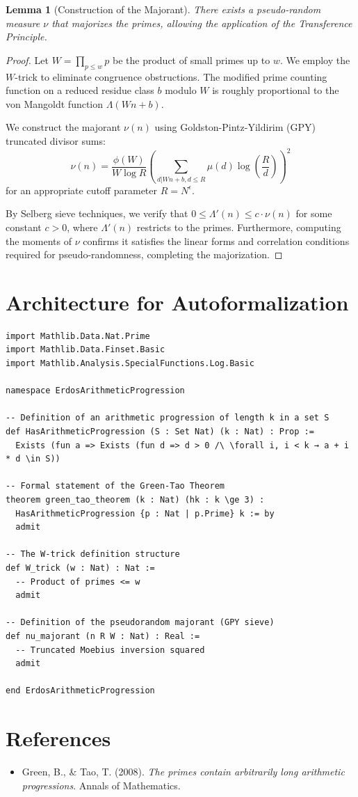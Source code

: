 \documentclass[12pt,a4paper]{article}
\newtheorem{lemma}{Lemma}
\begin{document}
\begin{lemma}[Construction of the Majorant]
There exists a pseudo-random measure $\nu$ that majorizes the primes, allowing the application of the Transference Principle.
\end{lemma}
\begin{proof}
Let $W = \prod_{p \leq w} p$ be the product of small primes up to $w$. We employ the $W$-trick to eliminate congruence obstructions. The modified prime counting function on a reduced residue class $b$ modulo $W$ is roughly proportional to the von Mangoldt function $\Lambda(Wn + b)$.

We construct the majorant $\nu(n)$ using Goldston-Pintz-Yildirim (GPY) truncated divisor sums:
$$ \nu(n) = \frac{\phi(W)}{W \log R} \left( \sum_{d | Wn + b, d \leq R} \mu(d) \log\left(\frac{R}{d}\right) \right)^2 $$
for an appropriate cutoff parameter $R = N^{\epsilon}$.

By Selberg sieve techniques, we verify that $0 \leq \Lambda'(n) \leq c \cdot \nu(n)$ for some constant $c>0$, where $\Lambda'(n)$ restricts to the primes. Furthermore, computing the moments of $\nu$ confirms it satisfies the linear forms and correlation conditions required for pseudo-randomness, completing the majorization.
\end{proof}

\section{Architecture for Autoformalization}

\begin{verbatim}
import Mathlib.Data.Nat.Prime
import Mathlib.Data.Finset.Basic
import Mathlib.Analysis.SpecialFunctions.Log.Basic

namespace ErdosArithmeticProgression

-- Definition of an arithmetic progression of length k in a set S
def HasArithmeticProgression (S : Set Nat) (k : Nat) : Prop :=
  Exists (fun a => Exists (fun d => d > 0 /\ \forall i, i < k → a + i * d \in S))

-- Formal statement of the Green-Tao Theorem
theorem green_tao_theorem (k : Nat) (hk : k \ge 3) :
  HasArithmeticProgression {p : Nat | p.Prime} k := by
  admit

-- The W-trick definition structure
def W_trick (w : Nat) : Nat :=
  -- Product of primes <= w
  admit

-- Definition of the pseudorandom majorant (GPY sieve)
def nu_majorant (n R W : Nat) : Real :=
  -- Truncated Moebius inversion squared
  admit

end ErdosArithmeticProgression
\end{verbatim}

\section*{References}
\begin{itemize}
    \item Green, B., \& Tao, T. (2008). \textit{The primes contain arbitrarily long arithmetic progressions}. Annals of Mathematics.
\end{itemize}
\end{document}
